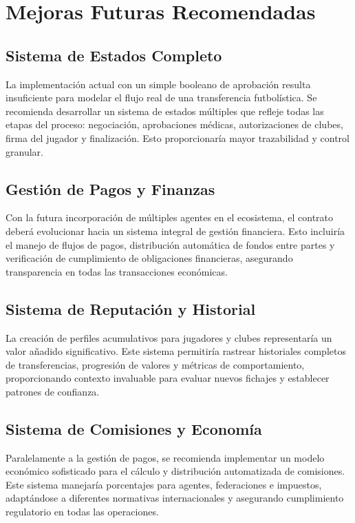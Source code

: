 \documentclass[12pt,a4paper]{article}
\begin{document}
\section{Mejoras Futuras Recomendadas}

\subsection{Sistema de Estados Completo}
La implementación actual con un simple booleano de aprobación resulta insuficiente para modelar el flujo real de una transferencia futbolística. Se recomienda desarrollar un sistema de estados múltiples que refleje todas las etapas del proceso: negociación, aprobaciones médicas, autorizaciones de clubes, firma del jugador y finalización. Esto proporcionaría mayor trazabilidad y control granular.

\subsection{Gestión de Pagos y Finanzas}
Con la futura incorporación de múltiples agentes en el ecosistema, el contrato deberá evolucionar hacia un sistema integral de gestión financiera. Esto incluiría el manejo de flujos de pagos, distribución automática de fondos entre partes y verificación de cumplimiento de obligaciones financieras, asegurando transparencia en todas las transacciones económicas.

\subsection{Sistema de Reputación y Historial}
La creación de perfiles acumulativos para jugadores y clubes representaría un valor añadido significativo. Este sistema permitiría rastrear historiales completos de transferencias, progresión de valores y métricas de comportamiento, proporcionando contexto invaluable para evaluar nuevos fichajes y establecer patrones de confianza.

\subsection{Sistema de Comisiones y Economía}
Paralelamente a la gestión de pagos, se recomienda implementar un modelo económico sofisticado para el cálculo y distribución automatizada de comisiones. Este sistema manejaría porcentajes para agentes, federaciones e impuestos, adaptándose a diferentes normativas internacionales y asegurando cumplimiento regulatorio en todas las operaciones.
	
\end{document}
